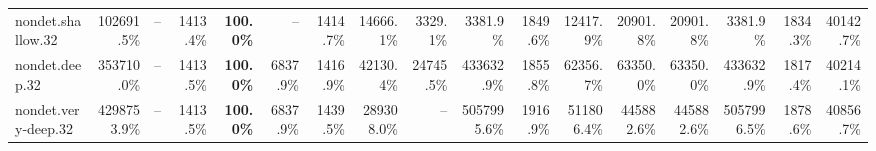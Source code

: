 \documentclass{article}
\begin{document}
\begin{center}
{\begin{tabular}{lrrrrrrrrrrrrrrrr}
nondet.shallow.32 & 102691.5\% & -- & 1413.4\% & \textbf{100.0\%} & -- & 1414.7\% & 14666.1\% & 3329.1\% & 3381.9\% & 1849.6\% & 12417.9\% & 20901.8\% & 20901.8\% & 3381.9\% & 1834.3\% & 40142.7\% \\
nondet.deep.32 & 353710.0\% & -- & 1413.5\% & \textbf{100.0\%} & 6837.9\% & 1416.9\% & 42130.4\% & 24745.5\% & 433632.9\% & 1855.8\% & 62356.7\% & 63350.0\% & 63350.0\% & 433632.9\% & 1817.4\% & 40214.1\% \\
nondet.very-deep.32 & 4298753.9\% & -- & 1413.5\% & \textbf{100.0\%} & 6837.9\% & 1439.5\% & 289308.0\% & -- & 5057995.6\% & 1916.9\% & 511806.4\% & 445882.6\% & 445882.6\% & 5057996.5\% & 1878.6\% & 40856.7\% \\
\bottomrule
\end{tabular}
}
\end{center}
\end{document}
